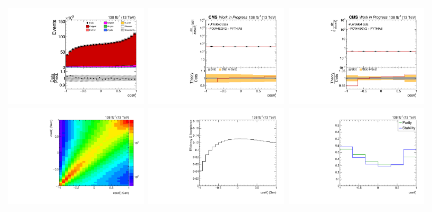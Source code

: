 \begin{refsection}
\begin{figure}[htb]
\begin{center}
 \includegraphics[width=0.32\textwidth]{fig_fullRun2UL/controlplots/combined/Hyp_AntiLeptonBk.pdf}
 \includegraphics[width=0.32\textwidth]{fig_fullRun2UL/unfolding/combined/UnfoldedResults_b1k.pdf}
 \includegraphics[width=0.32\textwidth]{fig_fullRun2UL/unfolding/combined/UnfoldedResultsNorm_b1k.pdf} \\
 \includegraphics[width=0.32\textwidth]{fig_fullRun2UL/unfolding/combined/ResponseMatrix_b1k.pdf}
 \includegraphics[width=0.32\textwidth]{fig_fullRun2UL/unfolding/combined/TotEff_b1k.pdf}
 \includegraphics[width=0.32\textwidth]{fig_fullRun2UL/unfolding/combined/PurStab_b1k.pdf} \\

\end{center}
\end{figure}
\end{refsection}
